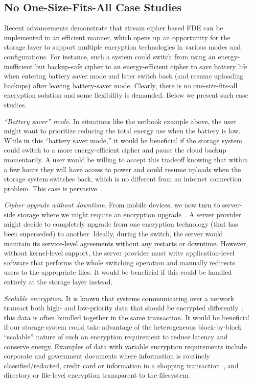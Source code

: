 \subsection{No One-Size-Fits-All Case Studies}

Recent advancements demonstrate that stream cipher based FDE can be implemented
in an efficient manner, which opens up an opportunity for the storage layer to
support multiple encryption technologies in various modes and configurations.
For instance, such a system could switch from using an energy-inefficient but
backup-safe cipher to an energy-efficient cipher to save battery life when
entering battery saver mode and later switch back (and resume uploading backups)
after leaving battery-saver mode. Clearly, there is no one-size-fits-all
encryption solution and some flexibility is demanded. Below we present \numCases
such case studies.

{\em ``Battery saver'' mode.} In situations like the netbook example above, the
user might want to prioritize reducing the total energy use when the battery is
low. While in this ``battery saver mode,'' it would be beneficial if the storage
system could switch to a more energy-efficient cipher and pause the cloud backup
momentarily. A user would be willing to accept this tradeoff knowing that within
a few hours they will have access to power and could resume uploads when the
storage system switches back, which is no different from an internet connection
problem. This case is pervasive~\cite{battery-saver1, battery-saver2,
battery-saver3, battery-saver4, battery-saver5}.

{\em Cipher upgrade without downtime.} From mobile devices, we now turn to
server-side storage where we might require an encryption
upgrade~\cite{upgrade-encryption1,upgrade-encryption2,upgrade-encryption3}. A
server provider might decide to completely upgrade from one encryption
technology (\eg that has been superseded) to another. Ideally, during the
switch, the server would maintain its service-level agreements without any
restarts or downtime. However, without kernel-level support, the server provider
must write application-level software that performs the whole switching
operation and manually redirects users to the appropriate files. It would be
beneficial if this could be handled entirely at the storage layer instead.

{\em Scalable encryption.} It is known that systems communicating over a network
transact both high- and low-priority data that should be encrypted
differently~\cite{ScalableSecurity}; this data is often bundled together in the
same transaction. It would be beneficial if our storage system could take
advantage of the heterogeneous block-by-block ``scalable'' nature of such an
encryption requirement to reduce latency and conserve energy. Examples of data
with variable encryption requirements include corporate and government documents
where information is routinely classified/redacted, credit card or information
in a shopping transaction~\cite{ScalableSecurity}, and directory or file-level
encryption transparent to the filesystem.
